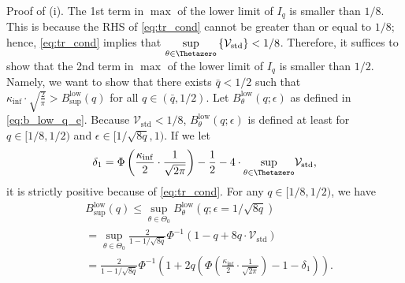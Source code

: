 \documentclass[journal]{IEEEtran}
\DeclareMathOperator{\Var}{Var}   %
\providecommand{\E}{\mathbb{E}} %
\renewcommand{\geq}{\geqslant} %
\renewcommand{\leq}{\leqslant} %
\theoremstyle{definition}
\begin{document}
Proof of (i). 
The 1st term in $\max$ of the lower limit of $I_q$ is smaller than $1/8$. This is because the RHS of \eqref{eq:tr_cond} cannot be greater than or equal to $1/8$; hence, \eqref{eq:tr_cond} implies that 
$\underset{\theta\in\Thetazero}{\sup} \left\{\mathcal{V}_\mathrm{std}\right\} < 1/8$. 
Therefore, it suffices to show that the 2nd term in $\max$ of the lower limit of $I_q$ is smaller than $1/2$.
Namely, we want to show that there exists $\bar{q} < 1/2$ such that $\kappa_{\inf} \cdot \sqrt{\frac{2}{\pi}} > B_{\sup}^\mathrm{low}(q)$ for all $q \in (\bar{q}, 1/2)$.
Let $B_\theta^\text{low}(q;\epsilon)$ as defined in \eqref{eq:b_low_q_e}. 
Because 
$\mathcal{V}_\mathrm{std}< 1/8$,
$B_\theta^\text{low}(q; \epsilon)$ is defined at least for $q \in [1/8, 1/2)$ and $\epsilon \in [1/\sqrt{8 q}, 1)$.
If we let 
\begin{equation}
\delta_1 = \Phi\left(\frac{\kappa_{\inf}}{2}\cdot\frac{1}{\sqrt{2\pi}}\right) - \frac12 - 4\cdot\underset{\theta\in\Thetazero}{\sup}
\mathcal{V}_\mathrm{std} ,
\end{equation}
it is strictly positive because of \eqref{eq:tr_cond}.    
For any $q \in [1/8, 1/2)$, we have
\begin{equation}
\begin{split}
\label{eq:sup_b_low_upper}
&B_{\sup}^\text{low}(q)
\leq
\sup_{\theta \in \Theta_0} B_\theta^\mathrm{low}(q; \epsilon=1/\sqrt{8q})
\\
&=
\sup_{\theta \in \Theta_0}
    \frac{2}{1 - 1/\sqrt{8q}} \Phi^{-1} \left(1 - q + 8 q \cdot \mathcal{V}_\mathrm{std}\right)
\\
&=
\frac{2}{1 - 1/\sqrt{8q}} \Phi^{-1} \left( 1 + 2q \left(\Phi\left(\frac{\kappa_{\inf}}{2}\cdot\frac{1}{\sqrt{2\pi}}\right) - 1 - \delta_1 \right)\right) .
\end{split}
\end{equation}    
\end{document}
